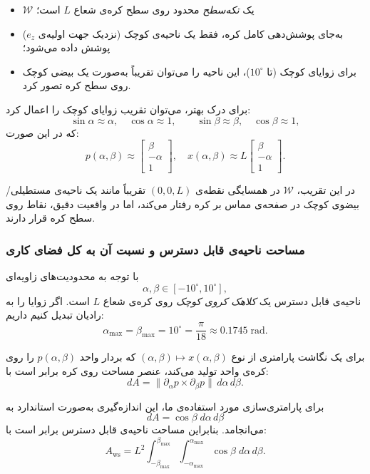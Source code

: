 \documentclass{article}
\begin{document}
\begin{itemize}
	\item \(\mathcal{W}\) یک \emph{تکه‌سطح} محدود روی سطح کره‌ی شعاع \(L\) است؛
	\item به‌جای پوشش‌دهی کامل کره، فقط یک ناحیه‌ی کوچک (نزدیک جهت اولیه‌ی \(e_z\)) پوشش داده می‌شود؛
	\item برای زوایای کوچک (تا \(10^\circ\))، این ناحیه را می‌توان تقریباً به‌صورت یک بیضی کوچک روی سطح کره تصور کرد.
\end{itemize}

برای درک بهتر، می‌توان تقریب زوایای کوچک را اعمال کرد:
\[
\sin\alpha \approx \alpha,\quad
\cos\alpha \approx 1,\qquad
\sin\beta \approx \beta,\quad
\cos\beta \approx 1,
\]
که در این صورت:
\[
p(\alpha,\beta) \approx
\begin{bmatrix}
	\beta\\[2pt]
	-\alpha\\[2pt]
	1
\end{bmatrix},
\quad
x(\alpha,\beta) \approx
L\begin{bmatrix}
	\beta\\[2pt]
	-\alpha\\[2pt]
	1
\end{bmatrix}.
\]

در این تقریب، \(\mathcal{W}\) در همسایگی نقطه‌ی
\(
(0,0,L)
\)
تقریباً مانند یک ناحیه‌ی مستطیلی/بیضوی کوچک در صفحه‌ی مماس بر کره رفتار می‌کند، اما در واقعیت دقیق، نقاط روی سطح کره قرار دارند.
\subsubsection{مساحت ناحیه‌ی قابل دسترس و نسبت آن به کل فضای کاری}

با توجه به محدودیت‌های زاویه‌ای
\[
\alpha,\beta \in [-10^\circ,10^\circ],
\]
ناحیه‌ی قابل دسترس یک \emph{کلاهک کروی کوچک} روی کره‌ی شعاع \(L\) است.  
اگر زوایا را به رادیان تبدیل کنیم داریم:
\[
\alpha_{\max}=\beta_{\max}=10^\circ=\frac{\pi}{18}\approx 0.1745\;\text{rad}.
\]

برای یک نگاشت پارامتری از نوع
\(
(\alpha,\beta)\mapsto x(\alpha,\beta)
\)
که بردار واحد \(p(\alpha,\beta)\) را روی کره‌ی واحد تولید می‌کند،  
عنصر مساحت روی کره برابر است با:
\[
dA = \|\partial_\alpha p \times \partial_\beta p\|\, d\alpha\, d\beta.
\]

برای پارامتری‌سازی مورد استفاده‌ی ما، این اندازه‌گیری به‌صورت استاندارد به
\[
dA = \cos\beta \; d\alpha\, d\beta
\]
می‌انجامد.  
بنابراین مساحت ناحیه‌ی قابل دسترس برابر است با:
\[
A_{\mathrm{ws}}
= L^2
\int_{-\beta_{\max}}^{\beta_{\max}}
\int_{-\alpha_{\max}}^{\alpha_{\max}}
\cos\beta\; d\alpha\, d\beta.
\]
\end{document}
